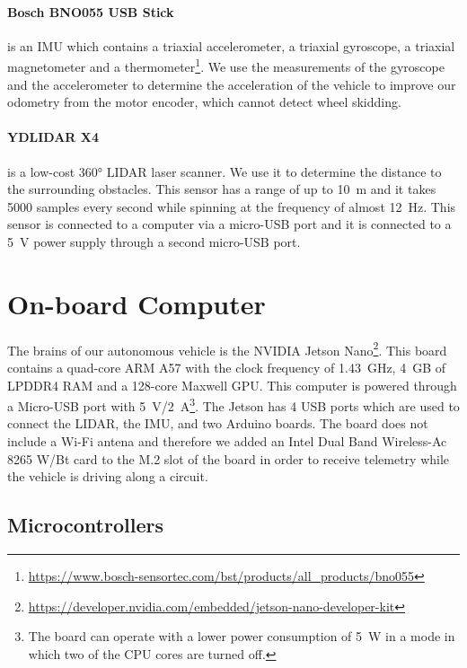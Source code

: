 \paragraph{Bosch BNO055 USB Stick} is an \gls{IMU} which contains a triaxial accelerometer, a triaxial gyroscope, a triaxial magnetometer and a thermometer\footnote{\url{https://www.bosch-sensortec.com/bst/products/all\_products/bno055}}. We use the measurements of the gyroscope and the accelerometer to determine the acceleration of the vehicle to improve our odometry from the motor encoder, which cannot detect wheel skidding.

\paragraph{YDLIDAR X4} is a low-cost \ang{360} \gls{LIDAR} laser scanner. We use it to determine the distance to the surrounding obstacles. This sensor has a range of up to \SI{10}{\meter} and it takes \num{5000} samples every second while spinning at the frequency of almost \SI{12}{\hertz}. This sensor is connected to a computer via a micro-USB port and it is connected to a \SI{5}{\volt} power supply through a second micro-USB port.

\section{On-board Computer}

The brains of our autonomous vehicle is the NVIDIA Jetson Nano\footnote{\url{https://developer.nvidia.com/embedded/jetson-nano-developer-kit}}. This board contains a quad-core ARM A57 with the clock frequency of \SI{1.43}{\giga\hertz}, \SI{4}{\giga B} of LPDDR4 RAM and a 128-core Maxwell GPU. This computer is powered through a Micro-USB port with \SI{5}{\volt}/\SI{2}{\ampere}\footnote{The board can operate with a lower power consumption of \SI{5}{\watt} in a mode in which two of the CPU cores are turned off.}. The Jetson has 4 USB ports which are used to connect the \gls*{LIDAR}, the \gls*{IMU}, and two Arduino boards. The board does not include a Wi-Fi antena and therefore we added an Intel Dual Band Wireless-Ac 8265 W/Bt card to the M.2 slot of the board in order to receive telemetry while the vehicle is driving along a circuit.

\subsection{Microcontrollers}

